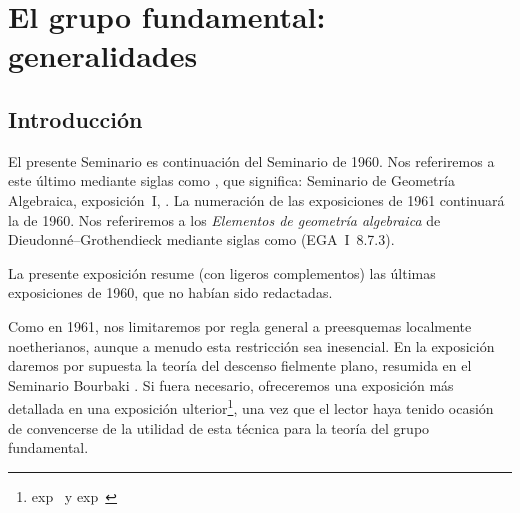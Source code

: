 
\chapter{El grupo fundamental: generalidades}
\label{V}

\setcounter{section}{-1}
\section{Introducción}

El presente Seminario es continuación del Seminario de 1960. Nos referiremos
a este último mediante siglas como , que significa: Seminario de
Geometría Algebraica, exposición~I, . La numeración de las exposiciones
de 1961 continuará la de 1960. Nos referiremos a los \emph{Elementos de
geometría algebraica} de Dieudonné--Grothendieck mediante siglas como
(EGA~I~8.7.3).

La presente exposición resume (con ligeros complementos) las últimas
exposiciones de 1960, que no habían sido redactadas.

Como en 1961, nos limitaremos por regla general a preesquemas localmente
noetherianos, aunque a menudo esta restricción sea inesencial. En la
exposición~ daremos por supuesta la teoría del descenso fielmente
plano, resumida en el Seminario Bourbaki . Si fuera necesario,
ofreceremos una exposición más detallada en una exposición
ulterior\footnote{\Cf exp\ptbl\  y exp\ptbl\ }, una vez que
el lector haya tenido ocasión de convencerse de la utilidad de esta técnica
para la teoría del grupo fundamental.
